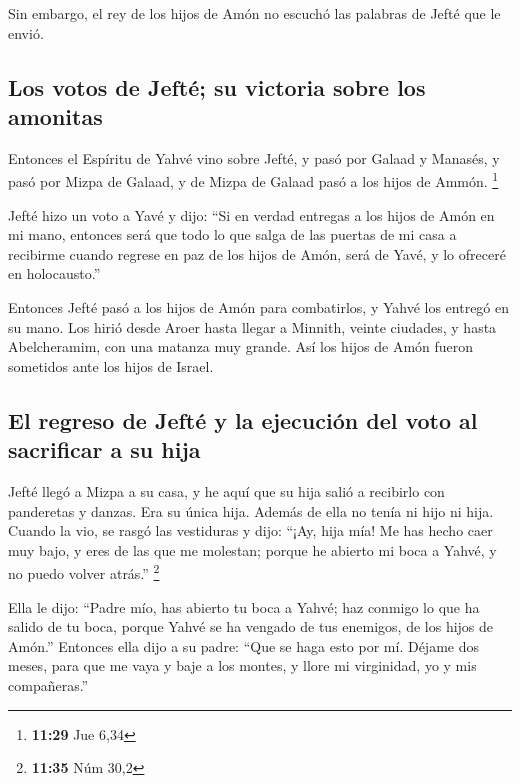 \begin{paracol}{2}
 Sin embargo, el rey de los hijos de Amón no escuchó las
palabras de Jefté que le envió.

\hypertarget{los-votos-de-jeftuxe9-su-victoria-sobre-los-amonitas}{%
\subsection{Los votos de Jefté; su victoria sobre los
amonitas}\label{los-votos-de-jeftuxe9-su-victoria-sobre-los-amonitas}}

 Entonces el Espíritu de Yahvé vino sobre Jefté, y pasó
por Galaad y Manasés, y pasó por Mizpa de Galaad, y de Mizpa de Galaad
pasó a los hijos de Ammón. \footnote{\textbf{11:29} Jue 6,34}

 Jefté hizo un voto a Yavé y dijo: ``Si en verdad
entregas a los hijos de Amón en mi mano,  entonces será
que todo lo que salga de las puertas de mi casa a recibirme cuando
regrese en paz de los hijos de Amón, será de Yavé, y lo ofreceré en
holocausto.''

 Entonces Jefté pasó a los hijos de Amón para
combatirlos, y Yahvé los entregó en su mano.  Los hirió
desde Aroer hasta llegar a Minnith, veinte ciudades, y hasta
Abelcheramim, con una matanza muy grande. Así los hijos de Amón fueron
sometidos ante los hijos de Israel.

\hypertarget{el-regreso-de-jeftuxe9-y-la-ejecuciuxf3n-del-voto-al-sacrificar-a-su-hija}{%
\subsection{El regreso de Jefté y la ejecución del voto al sacrificar a
su
hija}\label{el-regreso-de-jeftuxe9-y-la-ejecuciuxf3n-del-voto-al-sacrificar-a-su-hija}}

 Jefté llegó a Mizpa a su casa, y he aquí que su hija
salió a recibirlo con panderetas y danzas. Era su única hija. Además de
ella no tenía ni hijo ni hija.  Cuando la vio, se rasgó
las vestiduras y dijo: ``¡Ay, hija mía! Me has hecho caer muy bajo, y
eres de las que me molestan; porque he abierto mi boca a Yahvé, y no
puedo volver atrás.'' \footnote{\textbf{11:35} Núm 30,2}

 Ella le dijo: ``Padre mío, has abierto tu boca a Yahvé;
haz conmigo lo que ha salido de tu boca, porque Yahvé se ha vengado de
tus enemigos, de los hijos de Amón.''  Entonces ella dijo
a su padre: ``Que se haga esto por mí. Déjame dos meses, para que me
vaya y baje a los montes, y llore mi virginidad, yo y mis compañeras.''


\end{paracol}
